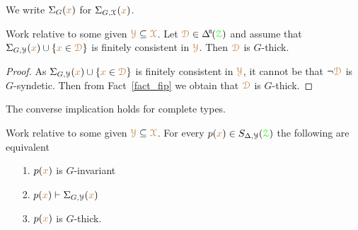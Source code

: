 
We write $\Sigma_G({\color{brown} x})$ for $\Sigma_{G,\EuScript X}({\color{brown} x})$.


\begin{corollary}\label{corol_q_pers}
  Work relative to some given ${\color{brown}\EuScript Y}\subseteq{\color{brown}\EuScript X}$.
  Let $\mrD\in\BDelta(\grZ)$ and assume that $\Sigma_{G,\EuScript Y}({\color{brown} x})\cup\{{\color{brown} x}\in{\color{brown}\EuScript D}\}$ is finitely consistent in ${\color{brown}\EuScript Y}$.
  Then ${\color{brown}\EuScript D}$ is $G$-thick.
\end{corollary}

\begin{proof}
  As $\Sigma_{G,\EuScript Y}({\color{brown} x})\cup\{{\color{brown} x}\in{\color{brown}\EuScript D}\}$ is finitely consistent in ${\color{brown}\EuScript Y}$, it cannot be that $\neg{\color{brown}\EuScript D}$ is $G$-syndetic.
  Then from Fact~\ref{fact_fip} we obtain that ${\color{brown}\EuScript D}$ is $G$-thick.
\end{proof}

The converse implication holds for complete types.

\begin{theorem}\label{thm_syndetic_invariant}
  Work relative to some given ${\color{brown}\EuScript Y}\subseteq{\color{brown}\EuScript X}$.
  For every $p({\color{brown} x})\in S_{\Delta,\EuScript Y}({\color{green}\EuScript Z})$ the following are equivalent
  \begin{itemize}
    \item[1.] $p({\color{brown} x})$ is $G$-invariant
    \item[2.] $p({\color{brown} x})\vdash\Sigma_{G,\EuScript Y}({\color{brown} x})$
    \item[3.] $p({\color{brown} x})$ is $G$-thick.
  \end{itemize}
\end{theorem}


